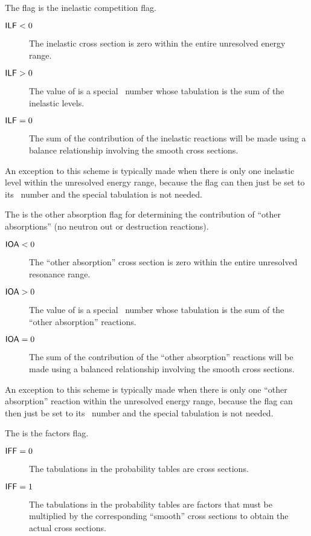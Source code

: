 \begin{description}[labelindent=1em]
  \item[\var{ILF}] The  flag is the inelastic competition flag.%
    \begin{description}
      \item[$\textsf{ILF}<0$] The inelastic cross section is zero within the entire unresolved energy range.
      \item[$\textsf{ILF}>0$] The value of  is a special \MT\ number whose tabulation is the sum of the inelastic levels.
      \item[$\textsf{ILF}=0$] The sum of the contribution of the inelastic reactions will be made using a balance relationship involving the smooth cross sections.
    \end{description}
    An exception to this scheme is typically made when there is only one inelastic level within the unresolved energy range, because the flag can then just be set to its \MT\ number and the special tabulation is not needed.
  \item[\var{IOA}] The  is the other absorption flag for determining the contribution of ``other absorptions'' (no neutron out or destruction reactions).
    \begin{description}
      \item[$\textsf{IOA}<0$] The ``other absorption'' cross section is zero within the entire unresolved resonance range.
      \item[$\textsf{IOA}>0$] The value of  is a special \MT\ number whose tabulation is the sum of the ``other absorption'' reactions.
      \item[$\textsf{IOA}=0$] The sum of the contribution of the ``other absorption'' reactions will be made using a balanced relationship involving the smooth cross sections.
    \end{description}
    An exception to this scheme is typically made when there is only one ``other absorption'' reaction within the unresolved energy range, because the flag can then just be set to its \MT\ number and the special tabulation is not needed.
  \item[\var{IFF}] The  is the factors flag.
    \begin{description}
      \item[$\textsf{IFF}=0$] The tabulations in the probability tables are cross sections.
      \item[$\textsf{IFF}=1$] The tabulations in the probability tables are factors that must be multiplied by the corresponding ``smooth'' cross sections to obtain the actual cross sections.
    \end{description}
\end{description}

